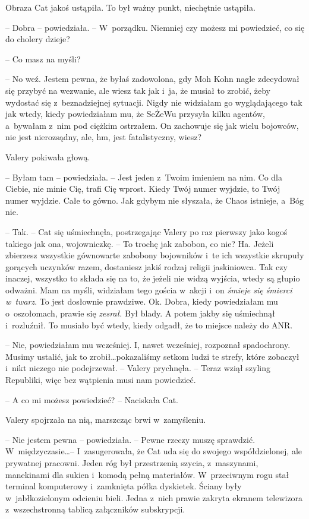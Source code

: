 \documentclass[oneside,polish,11pt,sfheadings]{mwbk}
\begin{document}
Obraza Cat jakoś ustąpiła. To był ważny punkt, niechętnie ustąpiła.

-- Dobra -- powiedziała. -- W~porządku. Niemniej czy możesz mi powiedzieć,
co się do cholery dzieje?

-- Co masz na myśli?

-- No weź. Jestem pewna, że byłaś zadowolona, gdy Moh Kohn nagle
zdecydował się przybyć na wezwanie, ale wiesz tak jak i~ja, że musiał to
zrobić, żeby wydostać się z~beznadziejnej sytuacji. Nigdy nie widziałam
go wyglądającego tak jak wtedy, kiedy powiedziałam mu, że SeŻeWu
przysyła kilku agentów, a~bywałam z~nim pod ciężkim ostrzałem. On
zachowuje się jak wielu bojowców, nie jest nierozsądny, ale, hm, jest
fatalistyczny, wiesz?

Valery pokiwała głową. 

-- Byłam tam -- powiedziała. -- Jest jeden z~Twoim
imieniem na nim. Co dla Ciebie, nie minie Cię, trafi Cię wprost. Kiedy
Twój numer wyjdzie, to Twój numer wyjdzie. Całe to gówno. Jak gdybym nie
słyszała, że Chaos istnieje, a~Bóg nie.

-- Tak. -- Cat się uśmiechnęła, postrzegając Valery po raz pierwszy jako
kogoś takiego jak ona, wojowniczkę. -- To trochę jak zabobon, co nie? Ha.
Jeżeli zbierzesz wszystkie gównowarte zabobony bojowników i~te ich
wszystkie skrupuły gorących uczynków razem, dostaniesz jakiś rodzaj
religii jaskiniowca. Tak czy inaczej, wszystko to składa się na to, że
jeżeli nie widzą wyjścia, wtedy są głupio odważni. Mam na myśli,
widziałam tego gościa w~akcji i~on \emph{śmieje się śmierci w~twarz}. To
jest dosłownie prawdziwe. Ok. Dobra, kiedy powiedziałam mu o~oszołomach,
prawie się \emph{zesrał.} Był blady. A potem jakby się uśmiechnął i~rozluźnił. To musiało być wtedy, kiedy odgadł, że to miejsce należy do
ANR.

-- Nie, powiedziałam mu wcześniej. I, nawet wcześniej, rozpoznał
spadochrony. Musimy ustalić, jak to zrobił\ldots pokazaliśmy setkom ludzi
te strefy, które zobaczył i~nikt niczego nie podejrzewał. -- Valery
prychnęła. -- Teraz wziął szyling Republiki, więc bez wątpienia musi nam
powiedzieć.

-- A co mi możesz powiedzieć? -- Naciskała Cat.

Valery spojrzała na nią, marszcząc brwi w~zamyśleniu.

-- Nie jestem pewna
-- powiedziała. -- Pewne rzeczy muszę sprawdzić. W~międzyczasie\ldots -- I~zasugerowała, że Cat uda się do swojego współdzielonej, ale prywatnej
pracowni. Jeden róg był przestrzenią szycia, z~maszynami, manekinami dla
sukien i~komodą pełną materiałów. W~przeciwnym rogu stał terminal
komputerowy i~zamknięta półka dyskietek. Ściany były w~jabłkozielonym
odcieniu bieli. Jedna z~nich prawie zakryta ekranem telewizora z~wszechstronną tablicą załączników subskrypcji.
\end{document}
